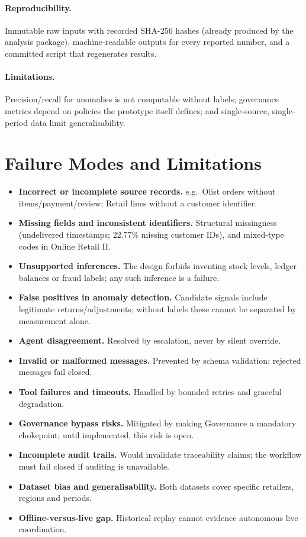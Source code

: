 \documentclass[11pt,a4paper]{article}
\begin{document}
\paragraph{Reproducibility.} Immutable raw inputs with recorded SHA-256 hashes (already produced by the analysis package), machine-readable outputs for every reported number, and a committed script that regenerates results.

\paragraph{Limitations.} Precision/recall for anomalies is not computable without labels; governance metrics depend on policies the prototype itself defines; and single-source, single-period data limit generalisability.

\section{Failure Modes and Limitations}
\label{sec:limitations}
\begin{itemize}
\item \textbf{Incorrect or incomplete source records.} e.g.\ Olist orders without items/\allowbreak payment/\allowbreak review; Retail lines without a customer identifier.
\item \textbf{Missing fields and inconsistent identifiers.} Structural missingness (undelivered timestamps; 22.77\% missing customer IDs), and mixed-type codes in Online Retail II.
\item \textbf{Unsupported inferences.} The design forbids inventing stock levels, ledger balances or fraud labels; any such inference is a failure.
\item \textbf{False positives in anomaly detection.} Candidate signals include legitimate returns/\allowbreak adjustments; without labels these cannot be separated by measurement alone.
\item \textbf{Agent disagreement.} Resolved by escalation, never by silent override.
\item \textbf{Invalid or malformed messages.} Prevented by schema validation; rejected messages fail closed.
\item \textbf{Tool failures and timeouts.} Handled by bounded retries and graceful degradation.
\item \textbf{Governance bypass risks.} Mitigated by making Governance a mandatory chokepoint; until implemented, this risk is open.
\item \textbf{Incomplete audit trails.} Would invalidate traceability claims; the workflow must fail closed if auditing is unavailable.
\item \textbf{Dataset bias and generalisability.} Both datasets cover specific retailers, regions and periods.
\item \textbf{Offline-versus-live gap.} Historical replay cannot evidence autonomous live coordination.
\end{itemize}
\end{document}
